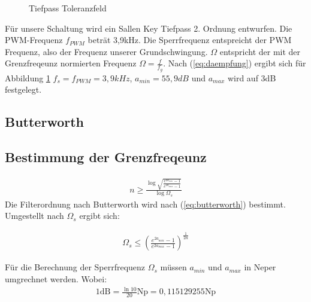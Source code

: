 \documentclass[11pt,twoside,a4paper,openright]{mpreport}
\begin{document}
\begin{figure}[H]
\centering
{}
\caption{Tiefpass Toleranzfeld}%
\label{fig:analog}
\end{figure}
Für unsere Schaltung wird ein Sallen Key Tiefpass 2. Ordnung entwurfen. Die PWM-Frequenz $f_{PWM}$ beträt 3,9kHz.
Die Sperrfrequenz entspreicht der PWM Frequenz, also der Frequenz unserer Grundschwingung. $\Omega$ entspricht der mit der Grenzfreqeunz 
normierten Frequenz $\Omega=\frac{f}{f_g}$. Nach (\ref{eq:daempfung}) ergibt sich für Abbildung \ref{fig:analog}
$f_s=f_{PWM}=3,9 kHz$, $a_{min}=55,9 dB$ und $a_{max}$ wird auf 3dB festgelegt.



\subsection{Butterworth}
\subsection{Bestimmung der Grenzfreqeunz}
\begin{align}
n \ge \frac{\log{\sqrt{\frac{e^{2a_{min}}-1}{e^{2a_{max}}-1}}}}{\log{\Omega_s}}
\label{eq:butterworth}
\end{align}
Die Filterordnung nach Butterworth wird nach (\ref{eq:butterworth}) bestimmt. Umgestellt nach $\Omega_s$ ergibt sich:

\begin{align}
\Omega_s \le  \left(\frac{e^{2a_{min}}-1}{e^{2a_{max}}-1}\right)^{\frac{1}{2n}}
\end{align}



Für die Berechnung der Sperrfrequenz $\Omega_s$ müssen  $a_{min}$ und $a_{max}$ in Neper umgrechnet werden. Wobei:
\begin{align*}
1 \text{dB} =  \frac{\ln{10}}{20}\text{Np} = 0,115129255 \text{Np}   
\end{align*}
\end{document}
